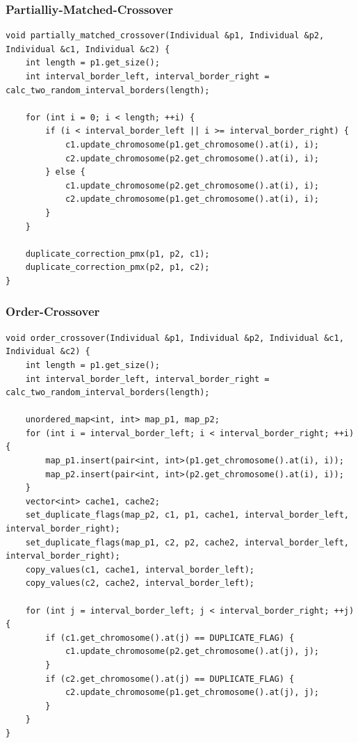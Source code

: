 \subsubsection{Partialliy-Matched-Crossover}
\begin{minipage}{\linewidth}
\begin{lstlisting}[caption={Partially-Matched-Crossover}, firstnumber=1, captionpos=b, label=lst:pmx]
void partially_matched_crossover(Individual &p1, Individual &p2, Individual &c1, Individual &c2) { 
	int length = p1.get_size();
	int interval_border_left, interval_border_right = calc_two_random_interval_borders(length);

	for (int i = 0; i < length; ++i) {
		if (i < interval_border_left || i >= interval_border_right) {
			c1.update_chromosome(p1.get_chromosome().at(i), i);
			c2.update_chromosome(p2.get_chromosome().at(i), i);
		} else {
			c1.update_chromosome(p2.get_chromosome().at(i), i);
			c2.update_chromosome(p1.get_chromosome().at(i), i);
		}
	}

	duplicate_correction_pmx(p1, p2, c1);
	duplicate_correction_pmx(p2, p1, c2);
}
\end{lstlisting}
\end{minipage}
\subsubsection{Order-Crossover}
\begin{minipage}{\linewidth}
\begin{lstlisting}[caption={Order-Crossover}, firstnumber=1, captionpos=b, label=lst:ox]
void order_crossover(Individual &p1, Individual &p2, Individual &c1, Individual &c2) {
	int length = p1.get_size();
	int interval_border_left, interval_border_right = calc_two_random_interval_borders(length);

	unordered_map<int, int> map_p1, map_p2;
	for (int i = interval_border_left; i < interval_border_right; ++i) {
		map_p1.insert(pair<int, int>(p1.get_chromosome().at(i), i));
		map_p2.insert(pair<int, int>(p2.get_chromosome().at(i), i));
	}
	vector<int> cache1, cache2;
	set_duplicate_flags(map_p2, c1, p1, cache1, interval_border_left, interval_border_right);
	set_duplicate_flags(map_p1, c2, p2, cache2, interval_border_left, interval_border_right);
	copy_values(c1, cache1, interval_border_left);
	copy_values(c2, cache2, interval_border_left);

	for (int j = interval_border_left; j < interval_border_right; ++j) {
		if (c1.get_chromosome().at(j) == DUPLICATE_FLAG) {
			c1.update_chromosome(p2.get_chromosome().at(j), j);
		}
		if (c2.get_chromosome().at(j) == DUPLICATE_FLAG) {
			c2.update_chromosome(p1.get_chromosome().at(j), j);
		}
	}
}
\end{lstlisting}
\end{minipage}
